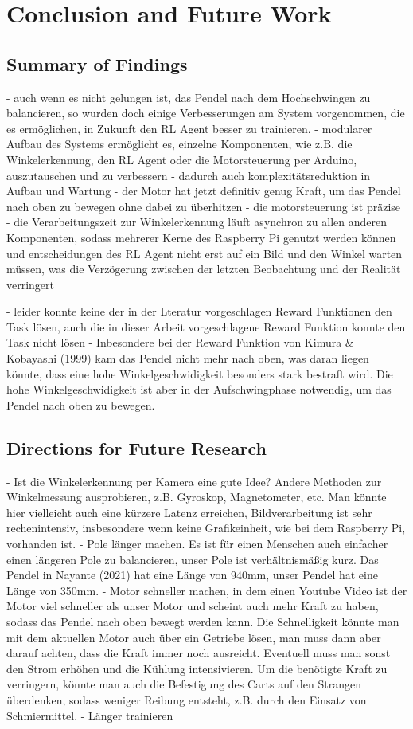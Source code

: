 \chapter{Conclusion and Future Work}

\section{Summary of Findings}
- auch wenn es nicht gelungen ist, das Pendel nach dem Hochschwingen zu balancieren, so wurden doch einige Verbesserungen am System vorgenommen, die es ermöglichen, in Zukunft den RL Agent besser zu trainieren.
- modularer Aufbau des Systems ermöglicht es, einzelne Komponenten, wie z.B. die Winkelerkennung, den RL Agent oder die Motorsteuerung per Arduino, auszutauschen und zu verbessern
- dadurch auch komplexitätsreduktion in Aufbau und Wartung
- der Motor hat jetzt definitiv genug Kraft, um das Pendel nach oben zu bewegen ohne dabei zu überhitzen
- die motorsteuerung ist präzise
- die Verarbeitungszeit zur Winkelerkennung läuft asynchron zu allen anderen Komponenten, sodass mehrerer Kerne des Raspberry Pi genutzt werden können und entscheidungen des RL Agent nicht erst auf ein Bild und den Winkel warten müssen, was die Verzögerung zwischen der letzten Beobachtung und der Realität verringert

- leider konnte keine der in der Lteratur vorgeschlagen Reward Funktionen den Task lösen, auch die in dieser Arbeit vorgeschlagene Reward Funktion konnte den Task nicht lösen
- Inbesondere bei der Reward Funktion von Kimura & Kobayashi (1999) kam das Pendel nicht mehr nach oben, was daran liegen könnte, dass eine hohe Winkelgeschwidigkeit besonders stark bestraft wird. Die hohe Winkelgeschwidigkeit ist aber in der Aufschwingphase notwendig, um das Pendel nach oben zu bewegen.

\section{Directions for Future Research}
- Ist die Winkelerkennung per Kamera eine gute Idee? Andere Methoden zur Winkelmessung ausprobieren, z.B. Gyroskop, Magnetometer, etc. Man könnte hier vielleicht auch eine kürzere Latenz erreichen, Bildverarbeitung ist sehr rechenintensiv, insbesondere wenn keine Grafikeinheit, wie bei dem Raspberry Pi, vorhanden ist.
- Pole länger machen. Es ist für einen Menschen auch einfacher einen längeren Pole zu balancieren, unser Pole ist verhältnismäßig kurz. Das Pendel in Nayante (2021) hat eine Länge von 940mm, unser Pendel hat eine Länge von 350mm.
- Motor schneller machen, in dem einen Youtube Video ist der Motor viel schneller als unser Motor und scheint auch mehr Kraft zu haben, sodass das Pendel nach oben bewegt werden kann. Die Schnelligkeit könnte man mit dem aktuellen Motor auch über ein Getriebe lösen, man muss dann aber darauf achten, dass die Kraft immer noch ausreicht. Eventuell muss man sonst den Strom erhöhen und die Kühlung intensivieren. Um die benötigte Kraft zu verringern, könnte man auch die Befestigung des Carts auf den Strangen überdenken, sodass weniger Reibung entsteht, z.B. durch den Einsatz von Schmiermittel.
- Länger trainieren